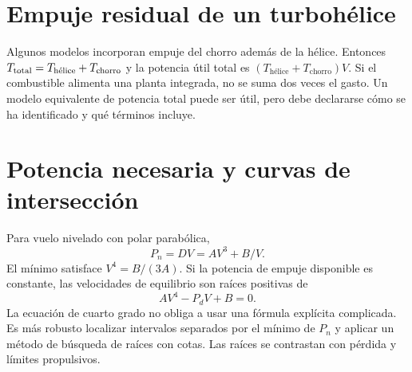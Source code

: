 \section{Empuje residual de un turbohélice}
Algunos modelos incorporan empuje del chorro además de la hélice. Entonces $T_{\rm total}=T_{\text{hélice}}+T_{\text{chorro}}$ y la potencia útil total es $(T_{\text{hélice}}+T_{\text{chorro}})V$. Si el combustible alimenta una planta integrada, no se suma dos veces el gasto. Un modelo equivalente de potencia total puede ser útil, pero debe declararse cómo se ha identificado y qué términos incluye.

\section{Potencia necesaria y curvas de intersección}
Para vuelo nivelado con polar parabólica,
\begin{equation}
P_n=DV=AV^3+B/V.
\end{equation}
El mínimo satisface $V^4=B/(3A)$. Si la potencia de empuje disponible es constante, las velocidades de equilibrio son raíces positivas de
\begin{equation}
AV^4-P_dV+B=0.
\end{equation}
La ecuación de cuarto grado no obliga a usar una fórmula explícita complicada. Es más robusto localizar intervalos separados por el mínimo de $P_n$ y aplicar un método de búsqueda de raíces con cotas. Las raíces se contrastan con pérdida y límites propulsivos.




